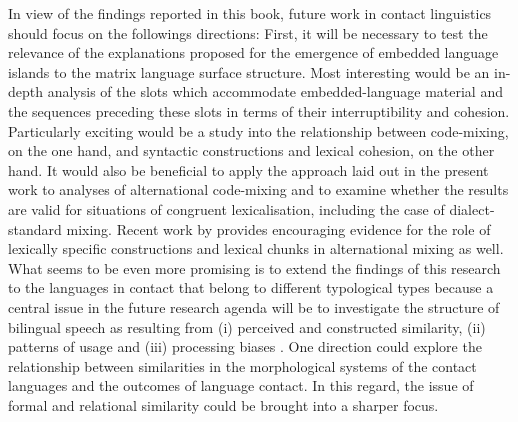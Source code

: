 In view of the findings reported in this book, future work in contact linguistics should focus on the followings directions: First, it will be necessary to test the relevance of the explanations proposed for the emergence of embedded language islands to the matrix language surface structure. Most interesting would be an in-depth analysis of the slots which accommodate embedded-language material and the sequences preceding these slots in terms of their interruptibility and cohesion. Particularly exciting would be a study into the relationship between code-mixing, on the one hand, and syntactic constructions and lexical cohesion, on the other hand. It would also be beneficial to apply the approach laid out in the present work to analyses of alternational code-mixing and to examine whether the results are valid for situations of congruent lexicalisation, including the case of dialect-standard mixing. Recent work by \citet{goria-units} provides encouraging evidence for the role of lexically specific constructions and lexical chunks in alternational mixing as well. What seems to be even more promising is to extend the findings of this research to the languages in contact that belong to different typological types because a central issue in the future research agenda will be to investigate the structure of bilingual speech as resulting from (i) perceived and constructed similarity, (ii) patterns of usage and (iii) processing biases \citep[see the papers in][]{hakimov-backus-20}. One direction could explore the relationship between similarities in the morphological systems of the contact languages and the outcomes of language contact. In this regard, the issue of formal and relational similarity could be brought into a sharper focus.
